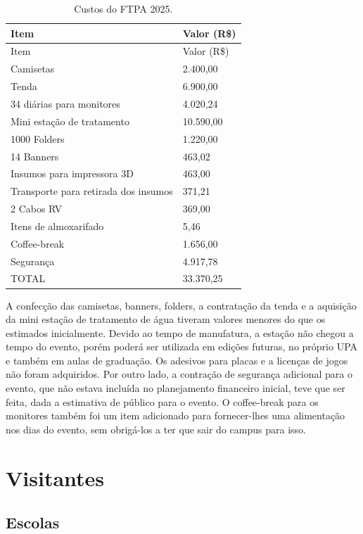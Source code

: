 \documentclass[
  letterpaper,
  DIV=11,
  numbers=noendperiod]{scrreprt}
\begin{document}
\begin{longtable}[]{@{}ll@{}}
\caption{Custos do FTPA 2025.}\tabularnewline
\toprule\noalign{}
Item & Valor (R\$) \\
\midrule\noalign{}
\endfirsthead
\toprule\noalign{}
Item & Valor (R\$) \\
\midrule\noalign{}
\endhead
\bottomrule\noalign{}
\endlastfoot
50 Camisetas & 2.400,00 \\
Tenda & 6.900,00 \\
34 diárias para monitores & 4.020,24 \\
Mini estação de tratamento & 10.590,00 \\
1000 Folders & 1.220,00 \\
14 Banners & 463,02 \\
Insumos para impressora 3D & 463,00 \\
Transporte para retirada dos insumos & 371,21 \\
2 Cabos RV & 369,00 \\
Itens de almoxarifado & 5,46 \\
Coffee-break & 1.656,00 \\
Segurança & 4.917,78 \\
TOTAL & 33.370,25 \\
\end{longtable}

A confecção das camisetas, banners, folders, a contratação da tenda e a
aquisição da mini estação de tratamento de água tiveram valores menores
do que os estimados inicialmente. Devido ao tempo de manufatura, a
estação não chegou a tempo do evento, porém poderá ser utilizada em
edições futuras, no próprio UPA e também em aulas de graduação. Os
adesivos para placas e a licenças de jogos não foram adquiridos. Por
outro lado, a contração de segurança adicional para o evento, que não
estava incluída no planejamento financeiro inicial, teve que ser feita,
dada a estimativa de público para o evento. O coffee-break para os
monitores também foi um item adicionado para fornecer-lhes uma
alimentação nos dias do evento, sem obrigá-los a ter que sair do campus
para isso.


\chapter{Visitantes}\label{visitantes}

\section{Escolas}\label{escolas-1}
\end{document}
